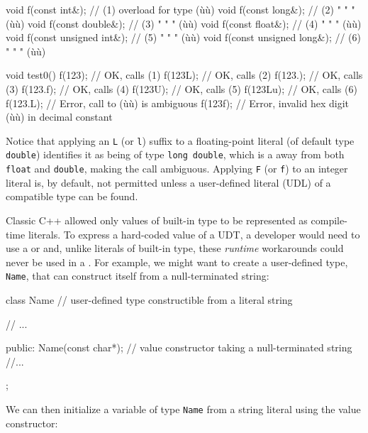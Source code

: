 \begin{emcppslisting}
void f(const int&);            // (1) overload for type (ù{}ù)
void f(const long&);           // (2)    "      "   "   (ù{}ù)
void f(const double&);         // (3)    "      "   "   (ù{}ù)
void f(const float&);          // (4)    "      "   "   (ù{}ù)
void f(const unsigned int&);   // (5)    "      "   "   (ù{}ù)
void f(const unsigned long&);  // (6)    "      "   "   (ù{}ù)

void test0()
{
    f(123);    // OK, calls (1)
    f(123L);   // OK, calls (2)
    f(123.);   // OK, calls (3)
    f(123.f);  // OK, calls (4)
    f(123U);   // OK, calls (5)
    f(123Lu);  // OK, calls (6)
    f(123.L);  // Error, call to (ù{}ù) is ambiguous
    f(123f);   // Error, invalid hex digit (ù{}ù) in decimal constant
}
\end{emcppslisting}
    
\noindent Notice that applying an \lstinline!L! (or \lstinline!l!) suffix to a
floating-point literal (of default type \lstinline!double!) identifies it
as being of type \lstinline!long!~\lstinline!double!, which is a
 away from both \lstinline!float! and
\lstinline!double!, making the call ambiguous. Applying \lstinline!F! (or
\lstinline!f!) to an integer literal is, by default, not permitted unless a
user-defined literal (UDL) of a compatible type can be found.

Classic C++ allowed only values of built-in type to be represented as
compile-time literals. To express a hard-coded value of a UDT, a
developer would need to use a  or
 and, unlike literals of built-in type, these
\emph{runtime} workarounds could never be used in a . For example, we might want to create a user-defined type,
\lstinline!Name!, that can construct itself from a null-terminated string:

\begin{emcppslisting}[emcppsbatch=e1]
class Name  // user-defined type constructible from a literal string
{
    // ...

public:
    Name(const char*);  // value constructor taking a null-terminated string
    //...
};
\end{emcppslisting}
    
\noindent We can then initialize a variable of type \lstinline!Name! from a string
literal using the value constructor:

